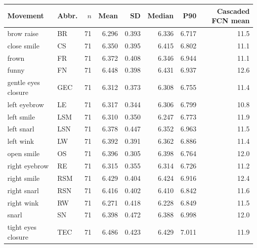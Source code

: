 \begin{tabular}{llrrrrrr}
\toprule
Movement & Abbr. & $n$ & Mean & SD & Median & P90 & Cascaded FCN mean \\
\midrule
brow raise & BR & 71 & 6.296 & 0.393 & 6.336 & 6.717 & 11.5 \\
close smile & CS & 71 & 6.350 & 0.395 & 6.415 & 6.802 & 11.1 \\
frown & FR & 71 & 6.372 & 0.408 & 6.346 & 6.944 & 11.1 \\
funny & FN & 71 & 6.448 & 0.398 & 6.431 & 6.937 & 12.6 \\
gentle eyes closure & GEC & 71 & 6.312 & 0.373 & 6.308 & 6.755 & 11.4 \\
left eyebrow & LE & 71 & 6.317 & 0.344 & 6.306 & 6.799 & 10.8 \\
left smile & LSM & 71 & 6.310 & 0.350 & 6.247 & 6.773 & 11.9 \\
left snarl & LSN & 71 & 6.378 & 0.447 & 6.352 & 6.963 & 11.5 \\
left wink & LW & 71 & 6.392 & 0.391 & 6.362 & 6.886 & 11.4 \\
open smile & OS & 71 & 6.396 & 0.305 & 6.398 & 6.764 & 12.0 \\
right eyebrow & RE & 71 & 6.315 & 0.355 & 6.314 & 6.726 & 11.2 \\
right smile & RSM & 71 & 6.429 & 0.404 & 6.424 & 6.916 & 12.4 \\
right snarl & RSN & 71 & 6.416 & 0.402 & 6.410 & 6.842 & 11.6 \\
right wink & RW & 71 & 6.271 & 0.418 & 6.228 & 6.849 & 11.5 \\
snarl & SN & 71 & 6.398 & 0.472 & 6.388 & 6.998 & 12.0 \\
tight eyes closure & TEC & 71 & 6.486 & 0.423 & 6.429 & 7.011 & 11.9 \\
\bottomrule
\end{tabular}
